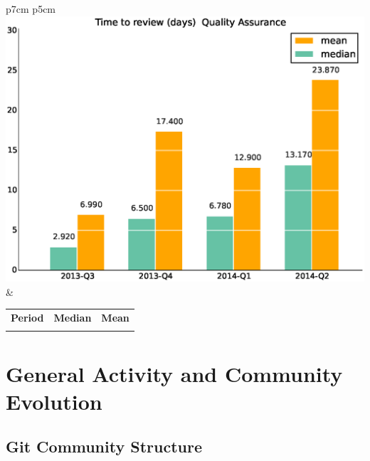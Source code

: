 \documentclass[a4wide,11pt]{report}
\begin{document}
\begin{tabular}{p{7cm} p{5cm}}
    \vspace{0pt} 
    \includegraphics[scale=.35]{figs/timetoreview_medianQualityAssurance.eps}
    & 
    \vspace{0pt}
    \begin{tabular}{l|r|r|}%
    \bfseries Period & \bfseries Median & \bfseries Mean %
    \csvreader[head to column names]{data/timetoreview_medianQualityAssurance.csv}{}%
    {\\ & \mediantime & \meantime}
    \end{tabular}
\end{tabular}


\chapter{General Activity and Community Evolution}

\section{Git Community Structure}
\end{document}
